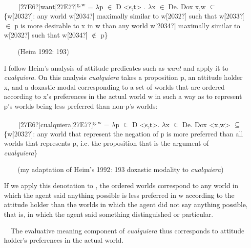 \begin{styleStandard}
\textbf{\ \ }\ \ [27E6?]want[27E7?]\textsuperscript{g,w} = $\lambda $p ${\in}$ D {\textless}s,t{\textgreater} . $\lambda $x ${\in}$ De. Dox x,w ${\subseteq}$ \{w[2032?]: any world w[2034?] maximally similar to w[2032?] such that w[2033?] ${\in}$ p is more desirable to x in w than any world w[2034?] maximally similar to w[2032?] such that w[2034?] ${\notin}$ p\}\ \ 
\end{styleStandard}

\begin{styleStandard}
\ \ \ \ (Heim 1992: 193)
\end{styleStandard}

\begin{styleStandard}
I follow Heim’s analysis of attitude predicates such as \textit{want} and apply it to \textit{cualquiera}. On this analysis \textit{cualquiera} takes a proposition p, an attitude holder x, and a doxastic modal corresponding to a set of worlds that are ordered according to x’s preferences in the actual world w in such a way as to represent p’s worlds being less preferred than non-p’s worlds:
\end{styleStandard}

\begin{styleStandard}
\label{bkm:Ref150787526}\textbf{\ \ }\ \ [27E6?]cualquiera[27E7?]\textsuperscript{g,w} = $\lambda $p ${\in}$ D {\textless}s,t{\textgreater}. $\lambda $x ${\in}$ De. Dox {\textless}x,w{\textgreater} ${\subseteq}$ \{w[2032?]: any world that represent the negation of p is more preferred than all worlds that represents p, i.e. the proposition that is the argument of \textit{cualquiera}\}\ \ 
\end{styleStandard}

\begin{styleStandard}
\ \ \ \ (my adaptation of Heim’s 1992: 193 doxastic modality to \textit{cualquiera})
\end{styleStandard}

\begin{styleStandard}
If we apply this denotation to , the ordered worlds correspond to any world in which the agent said anything possible is less preferred in w according to the attitude holder than the worlds in which the agent did not say anything possible, that is, in which the agent said something distinguished or particular.
\end{styleStandard}

\begin{styleStandard}
\ \ The evaluative meaning component of \textit{cualquiera} thus corresponds to attitude holder’s preferences in the actual world.
\end{styleStandard}

